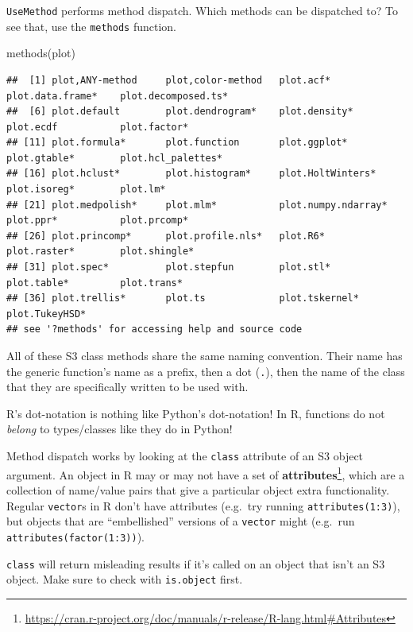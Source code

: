 \documentclass[
  12pt,
  krantz2]{krantz}
\makeatletter
\newenvironment{Shaded}{\begin{snugshade}}{\end{snugshade}}
\newcommand{\FunctionTok}[1]{\textcolor[rgb]{0,0,0}{#1}}
\newcommand{\NormalTok}[1]{#1}
\renewcommand{\href}[2]{#2\footnote{\url{#1}}}
\newenvironment{kframe}{%
\medskip{}
\setlength{\fboxsep}{.8em}
 \def\at@end@of@kframe{}%
 \ifinner\ifhmode%
  \def\at@end@of@kframe{\end{minipage}}%
  \begin{minipage}{\columnwidth}%
 \fi\fi%
 \def\FrameCommand##1{\hskip\@totalleftmargin \hskip-\fboxsep
 \colorbox{shadecolor}{##1}\hskip-\fboxsep
     \hskip-\linewidth \hskip-\@totalleftmargin \hskip\columnwidth}%
 \MakeFramed {\advance\hsize-\width
   \@totalleftmargin\z@ \linewidth\hsize
   \@setminipage}}%
 {\par\unskip\endMakeFramed%
 \at@end@of@kframe}
\renewenvironment{Shaded}{\begin{kframe}}{\end{kframe}}
\makeatother
\begin{document}
\texttt{UseMethod} performs method dispatch. Which methods can be dispatched to? To see that, use the \texttt{methods} function.

\begin{Shaded}
\begin{Highlighting}[]
\FunctionTok{methods}\NormalTok{(plot)}
\end{Highlighting}
\end{Shaded}

\begin{verbatim}
##  [1] plot,ANY-method     plot,color-method   plot.acf*           plot.data.frame*    plot.decomposed.ts*
##  [6] plot.default        plot.dendrogram*    plot.density*       plot.ecdf           plot.factor*       
## [11] plot.formula*       plot.function       plot.ggplot*        plot.gtable*        plot.hcl_palettes* 
## [16] plot.hclust*        plot.histogram*     plot.HoltWinters*   plot.isoreg*        plot.lm*           
## [21] plot.medpolish*     plot.mlm*           plot.numpy.ndarray* plot.ppr*           plot.prcomp*       
## [26] plot.princomp*      plot.profile.nls*   plot.R6*            plot.raster*        plot.shingle*      
## [31] plot.spec*          plot.stepfun        plot.stl*           plot.table*         plot.trans*        
## [36] plot.trellis*       plot.ts             plot.tskernel*      plot.TukeyHSD*     
## see '?methods' for accessing help and source code
\end{verbatim}

All of these S3 class methods share the same naming convention. Their name has the generic function's name as a prefix, then a dot (\texttt{.}), then the name of the class that they are specifically written to be used with.

R's dot-notation is nothing like Python's dot-notation! In R, functions do not \emph{belong} to types/classes like they do in Python!

Method dispatch works by looking at the \texttt{class} attribute of an S3 object argument. An object in R may or may not have a set of \href{https://cran.r-project.org/doc/manuals/r-release/R-lang.html\#Attributes}{\textbf{attributes}}, which are a collection of name/value pairs that give a particular object extra functionality. Regular \texttt{vector}s in R don't have attributes (e.g.~try running \texttt{attributes(1:3)}), but objects that are ``embellished'' versions of a \texttt{vector} might (e.g.~run \texttt{attributes(factor(1:3))}).

\texttt{class} will return misleading results if it's called on an object that isn't an S3 object. Make sure to check with \texttt{is.object} first.
\end{document}
